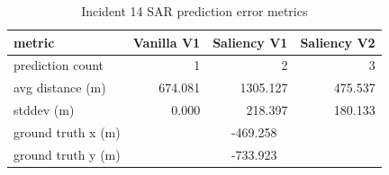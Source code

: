 \begin{table}[ht]
\centering
\caption{Incident 14 SAR prediction error metrics}
\label{tab:sar-incident-14}
\begin{tabular}{lrrr}
\hline
metric & Vanilla V1 & Saliency V1 & Saliency V2 \\
\hline
prediction count & 1 & 2 & 3 \\
avg distance (m) & 674.081 & 1305.127 & 475.537 \\
stddev (m) & 0.000 & 218.397 & 180.133 \\
ground truth x (m) & \multicolumn{3}{c}{-469.258} \\
ground truth y (m) & \multicolumn{3}{c}{-733.923} \\
\hline
\end{tabular}
\end{table}
